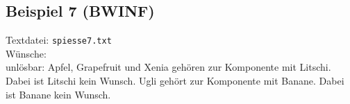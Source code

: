 \subsection{Beispiel 7 (BWINF)}\label{example:7}
Textdatei: \texttt{spiesse7.txt}\\

\noindent
Wünsche: \\

unlösbar: Apfel, Grapefruit und Xenia gehören zur Komponente mit Litschi. Dabei ist Litschi kein Wunsch.
Ugli gehört zur Komponente mit Banane. Dabei ist Banane kein Wunsch.
